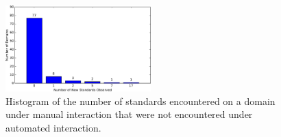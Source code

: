 \begin{figure}[ht]
  \centering
  \includegraphics[width=0.5\textwidth]{figures/measurement_external_validation.pdf}
  \caption{Histogram of the number of standards encountered on a domain under manual interaction that were not encountered under automated interaction.}
  \label{fig:external-validation-figure}
\end{figure}
